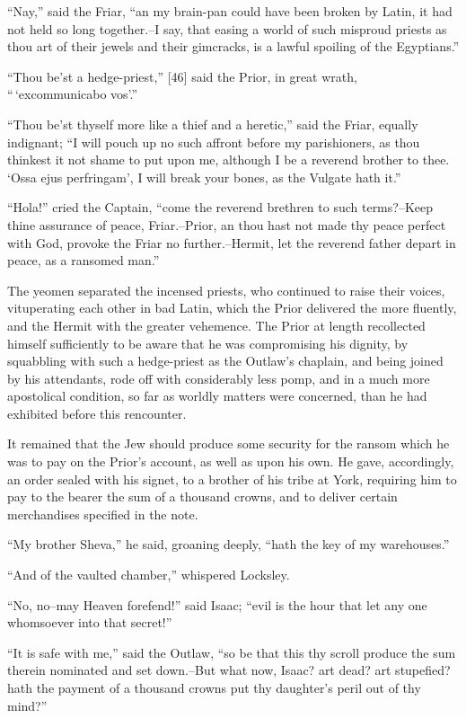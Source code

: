 ``Nay,'' said the Friar, ``an my brain-pan could have been broken by
Latin, it had not held so long together.--I say, that easing a world of
such misproud priests as thou art of their jewels and their gimcracks,
is a lawful spoiling of the Egyptians.''

``Thou be'st a hedge-priest,'' {[}46{]} said the Prior, in great wrath,
``\,`excommunicabo vos'.''

``Thou be'st thyself more like a thief and a heretic,'' said the Friar,
equally indignant; ``I will pouch up no such affront before my
parishioners, as thou thinkest it not shame to put upon me, although I
be a reverend brother to thee. `Ossa ejus perfringam', I will break your
bones, as the Vulgate hath it.''

``Hola!'' cried the Captain, ``come the reverend brethren to such
terms?--Keep thine assurance of peace, Friar.--Prior, an thou hast not
made thy peace perfect with God, provoke the Friar no further.--Hermit,
let the reverend father depart in peace, as a ransomed man.''

The yeomen separated the incensed priests, who continued to raise their
voices, vituperating each other in bad Latin, which the Prior delivered
the more fluently, and the Hermit with the greater vehemence. The Prior
at length recollected himself sufficiently to be aware that he was
compromising his dignity, by squabbling with such a hedge-priest as the
Outlaw's chaplain, and being joined by his attendants, rode off with
considerably less pomp, and in a much more apostolical condition, so far
as worldly matters were concerned, than he had exhibited before this
rencounter.

It remained that the Jew should produce some security for the ransom
which he was to pay on the Prior's account, as well as upon his own. He
gave, accordingly, an order sealed with his signet, to a brother of his
tribe at York, requiring him to pay to the bearer the sum of a thousand
crowns, and to deliver certain merchandises specified in the note.

``My brother Sheva,'' he said, groaning deeply, ``hath the key of my
warehouses.''

``And of the vaulted chamber,'' whispered Locksley.

``No, no--may Heaven forefend!'' said Isaac; ``evil is the hour that let
any one whomsoever into that secret!''

``It is safe with me,'' said the Outlaw, ``so be that this thy scroll
produce the sum therein nominated and set down.--But what now, Isaac?
art dead? art stupefied? hath the payment of a thousand crowns put thy
daughter's peril out of thy mind?''


